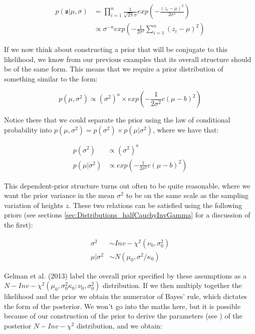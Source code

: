 \documentclass[11pt,fullpage]{book}
\begin{document}
\begin{equation}
\begin{align}
p(\boldsymbol{z}|\mu,\sigma) &= \prod\limits_{i=1}^{n}\frac{1}{\sqrt{2\pi} \sigma} exp\left(-\frac{(z_i-\mu)^2}{2\sigma^2}\right)\\
&\propto \sigma^{-n} exp\left(-\frac{1}{2\sigma^2}\sum\limits_{i=1}^{n}(z_i-\mu)^2 \right)
\end{align}
\end{equation} 

If we now think about constructing a prior that will be conjugate to this likelihood, we know from our previous examples that its overall structure should be of the same form. This means that we require a prior distribution of something similar to the form:

\begin{equation}
p(\mu,\sigma^2) \propto (\sigma^2)^a \times exp\left(-\frac{1}{2\sigma^2} c(\mu-b)^2 \right) 
\end{equation}

Notice there that we could separate the prior using the law of conditional probability into $p(\mu,\sigma^2) = p(\sigma^2)\times p(\mu|\sigma^2)$, where we have that:

\begin{align}
p(\sigma^2) &\propto (\sigma^2)^a\\
p(\mu|\sigma^2) &\propto exp\left(-\frac{1}{2\sigma^2} c(\mu-b)^2 \right)
\end{align}

This dependent-prior structure turns out often to be quite reasonable, where we want the prior variance in the mean $\sigma^2$ to be on the same scale as the sampling variation of heights $z$. These two relations can be satisfied using the following priors \cite{gelman2013bayesian} (see sections \ref{sec:Distributions_halfCauchyInvGamma} for a discussion of the first):

\begin{align}
\sigma^2 &\sim Inv-\chi^2(\nu_0,\sigma_0^2)\\
\mu|\sigma^2 &\sim N(\mu_0,\sigma^2/\kappa_0)
\end{align}

Gelman et al. (2013) label the overall prior specified by these assumptions as a $N-Inv-\chi^2(\mu_0,\sigma_0^2\kappa_0;\nu_0,\sigma_0^2)$ distribution. If we then multiply together the likelihood and the prior we obtain the numerator of Bayes' rule, which dictates the form of the posterior. We won't go into the maths here, but it is possible because of our construction of the prior to derive the parameters (see \cite{gelman2013bayesian}) of the posterior $N-Inv-\chi^2$ distribution, and we obtain:
\end{document}
